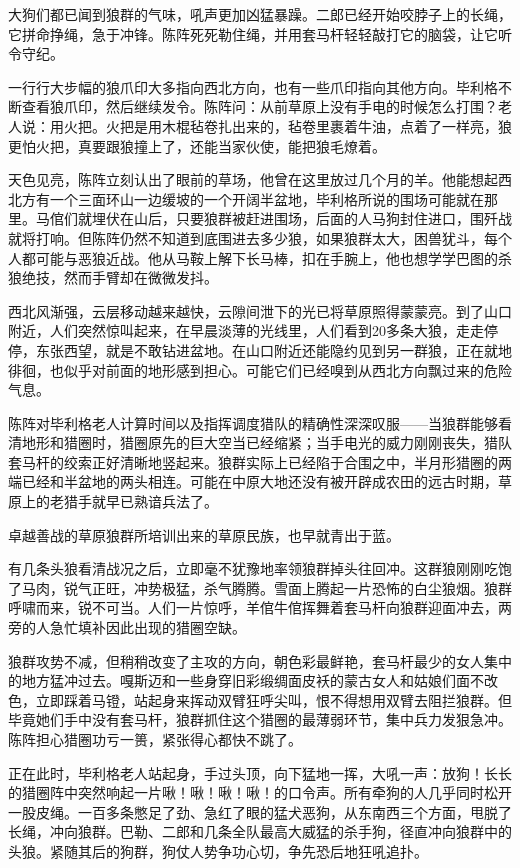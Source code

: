 \par 大狗们都已闻到狼群的气味，吼声更加凶猛暴躁。二郎已经开始咬脖子上的长绳，它拼命挣绳，急于冲锋。陈阵死死勒住绳，并用套马杆轻轻敲打它的脑袋，让它听令守纪。
\par 一行行大步幅的狼爪印大多指向西北方向，也有一些爪印指向其他方向。毕利格不断查看狼爪印，然后继续发令。陈阵问：从前草原上没有手电的时候怎么打围？老人说：用火把。火把是用木棍毡卷扎出来的，毡卷里裹着牛油，点着了一样亮，狼更怕火把，真要跟狼撞上了，还能当家伙使，能把狼毛燎着。
\par 
\par 天色见亮，陈阵立刻认出了眼前的草场，他曾在这里放过几个月的羊。他能想起西北方有一个三面环山一边缓坡的一个开阔半盆地，毕利格所说的围场可能就在那里。马倌们就埋伏在山后，只要狼群被赶进围场，后面的人马狗封住进口，围歼战就将打响。但陈阵仍然不知道到底围进去多少狼，如果狼群太大，困兽犹斗，每个人都可能与恶狼近战。他从马鞍上解下长马棒，扣在手腕上，他也想学学巴图的杀狼绝技，然而手臂却在微微发抖。
\par 西北风渐强，云层移动越来越快，云隙间泄下的光已将草原照得蒙蒙亮。到了山口附近，人们突然惊叫起来，在早晨淡薄的光线里，人们看到20多条大狼，走走停停，东张西望，就是不敢钻进盆地。在山口附近还能隐约见到另一群狼，正在就地徘徊，也似乎对前面的地形感到担心。可能它们已经嗅到从西北方向飘过来的危险气息。
\par 陈阵对毕利格老人计算时间以及指挥调度猎队的精确性深深叹服——当狼群能够看清地形和猎圈时，猎圈原先的巨大空当已经缩紧；当手电光的威力刚刚丧失，猎队套马杆的绞索正好清晰地竖起来。狼群实际上已经陷于合围之中，半月形猎圈的两端已经和半盆地的两头相连。可能在中原大地还没有被开辟成农田的远古时期，草原上的老猎手就早已熟谙兵法了。
\par 卓越善战的草原狼群所培训出来的草原民族，也早就青出于蓝。
\par 有几条头狼看清战况之后，立即毫不犹豫地率领狼群掉头往回冲。这群狼刚刚吃饱了马肉，锐气正旺，冲势极猛，杀气腾腾。雪面上腾起一片恐怖的白尘狼烟。狼群呼啸而来，锐不可当。人们一片惊呼，羊倌牛倌挥舞着套马杆向狼群迎面冲去，两旁的人急忙填补因此出现的猎圈空缺。
\par 狼群攻势不减，但稍稍改变了主攻的方向，朝色彩最鲜艳，套马杆最少的女人集中的地方猛冲过去。嘎斯迈和一些身穿旧彩缎绸面皮袄的蒙古女人和姑娘们面不改色，立即踩着马镫，站起身来挥动双臂狂呼尖叫，恨不得想用双臂去阻拦狼群。但毕竟她们手中没有套马杆，狼群抓住这个猎圈的最薄弱环节，集中兵力发狠急冲。陈阵担心猎圈功亏一篑，紧张得心都快不跳了。
\par 正在此时，毕利格老人站起身，手过头顶，向下猛地一挥，大吼一声：放狗！长长的猎圈阵中突然响起一片啾！啾！啾！啾！的口令声。所有牵狗的人几乎同时松开一股皮绳。一百多条憋足了劲、急红了眼的猛犬恶狗，从东南西三个方面，甩脱了长绳，冲向狼群。巴勒、二郎和几条全队最高大威猛的杀手狗，径直冲向狼群中的头狼。紧随其后的狗群，狗仗人势争功心切，争先恐后地狂吼追扑。
